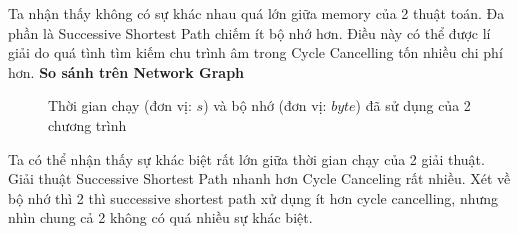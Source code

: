 \documentclass[a4paper]{article}
\begin{document}
{Ta nhận thấy không có sự khác nhau quá lớn giữa memory của 2 thuật toán. Đa phần là Successive Shortest Path chiếm ít bộ nhớ hơn. Điều này có thể được lí giải do quá tình tìm kiếm chu trình âm trong Cycle Cancelling tốn nhiều chi phí hơn.}
\newpage
\textbf{So sánh trên Network Graph}
\begin{figure}[h]
  \centering
  \hfill
  \caption{Thời gian chạy (đơn vị: $s$) và bộ nhớ (đơn vị: $byte$) đã sử dụng của 2 chương trình}
\end{figure}

{Ta có thể nhận thấy sự khác biệt rất lớn giữa thời gian chạy của 2 giải thuật. Giải thuật Successive Shortest Path nhanh hơn Cycle Canceling rất nhiều. Xét về bộ nhớ thì 2 thì successive shortest path xử dụng ít hơn cycle cancelling, nhưng nhìn chung cả 2 không có quá nhiều sự khác biệt. }
\end{document}
